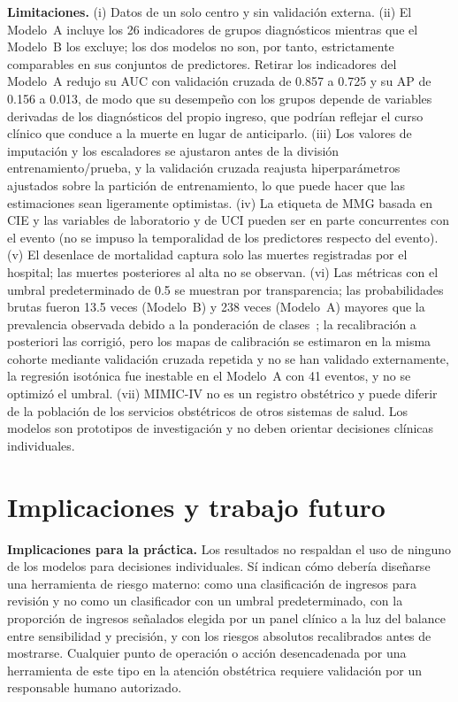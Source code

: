 \documentclass[healthcare,article,submit,pdftex,moreauthors]{Definitions/mdpi_es}
\begin{document}
\textbf{Limitaciones.} (i) Datos de un solo centro y sin validación externa. (ii)
El Modelo~A incluye los 26 indicadores de grupos diagnósticos mientras que el Modelo~B los excluye; los
dos modelos no son, por tanto, estrictamente comparables en sus conjuntos de predictores. Retirar los indicadores del
Modelo~A redujo su AUC con validación cruzada de 0.857 a 0.725 y su AP de 0.156 a 0.013, de modo que su
desempeño con los grupos depende de variables derivadas de los diagnósticos del propio ingreso, que podrían
reflejar el curso clínico que conduce a la muerte en lugar de anticiparlo. (iii) Los valores de imputación y los escaladores
se ajustaron antes de la división entrenamiento/prueba, y la validación cruzada reajusta
hiperparámetros ajustados sobre la partición de entrenamiento, lo que puede hacer que las estimaciones sean ligeramente
optimistas. (iv) La etiqueta de MMG basada en CIE y las variables de laboratorio y de UCI pueden ser en parte concurrentes con el
evento (no se impuso la temporalidad de los predictores respecto del evento). (v) El desenlace de
mortalidad captura solo las muertes registradas por el hospital; las muertes posteriores al alta no
se observan. (vi) Las métricas con el umbral predeterminado de 0.5 se muestran por transparencia;
las probabilidades brutas fueron 13.5 veces (Modelo~B) y 238 veces (Modelo~A) mayores que la
prevalencia observada debido a la ponderación de clases~\cite{NiculescuMizil2005Probabilities,vandenGoorbergh2022Harm,VanCalster2019Calibration}; la recalibración a posteriori las corrigió, pero los mapas de calibración se
estimaron en la misma cohorte mediante validación cruzada repetida y no se han validado externamente, la regresión isotónica fue inestable en el Modelo~A con 41 eventos,
y no se optimizó el umbral. (vii) MIMIC-IV no es un registro obstétrico y
puede diferir de la población de los servicios obstétricos de
otros sistemas de salud. Los modelos son prototipos de investigación y no deben orientar
decisiones clínicas individuales.

\section{Implicaciones y trabajo futuro}\label{sec:implications}
\textbf{Implicaciones para la práctica.} Los resultados no respaldan el uso de ninguno de los modelos
para decisiones individuales. Sí indican cómo debería diseñarse una herramienta de riesgo materno:
como una clasificación de ingresos para revisión y no como un clasificador con un umbral predeterminado,
con la proporción de ingresos señalados elegida por un panel clínico a la luz del balance entre sensibilidad
y precisión, y con los riesgos absolutos recalibrados antes de mostrarse. Cualquier punto de
operación o acción desencadenada por una herramienta de este tipo en la atención obstétrica requiere validación
por un responsable humano autorizado.
\end{document}
